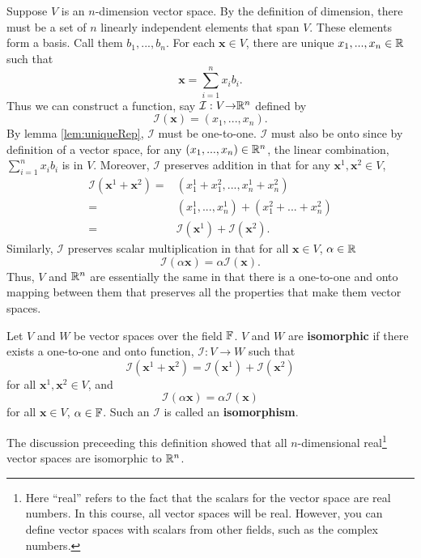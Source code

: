 Suppose $V$ is an $n$-dimension vector space. By the definition of dimension,
there must be a set of $n$ linearly independent elements that span
$V$. These elements form a basis. Call them $b_1, ..., b_n$. For each
$\mathbf{x} \in V$, there are unique $x_1, ..., x_n \in \mathbb{R}$ such that 
\[ \mathbf{x} = \sum_{i=1}^n x_i b_i. \]
Thus we can construct a function, say $\mathcal{I}: V {\rightarrow} \mathbb{R}^n$ defined by 
\[ \mathcal{I}(\mathbf{x}) = (x_1, ..., x_n). \]
By lemma \ref{lem:uniqueRep}, $\mathcal{I}$ must be one-to-one. $\mathcal{I}$ must also be
onto since by definition of a vector space, for any $(x_1, ..., x_n)
\in \mathbb{R}^n$, the linear combination, $\sum_{i=1}^n x_i b_i$ is in
$V$. Moreover, $\mathcal{I}$ preserves addition in that for
any $\mathbf{x}^1, \mathbf{x}^2 \in V$,
\begin{align*}
  \mathcal{I}(\mathbf{x}^1 + \mathbf{x}^2) = & (x_1^1 + x_1^2, ..., x_n^1 + x_n^2) \\
  = & (x_1^1, ..., x_n^1) + (x_1^2 + ... + x_n^2) \\
  = & \mathcal{I}(\mathbf{x}^1) + \mathcal{I}(\mathbf{x}^2).
\end{align*}
Similarly, $\mathcal{I}$ preserves scalar multiplication in that for all $\mathbf{x} \in
V$, $\alpha \in \mathbb{R}$
\[ \mathcal{I}(\alpha \mathbf{x}) = \alpha \mathcal{I}(\mathbf{x}). \]
Thus, $V$ and $\mathbb{R}^n$ are essentially the same in that there is a
one-to-one and onto mapping between them that preserves all the
properties that make them vector spaces. 
\begin{definition}
  Let $V$ and $W$ be vector spaces over the field $\mathbb{F}$. $V$ and $W$ are
  \textbf{isomorphic} if there exists a one-to-one and onto function,
  $\mathcal{I}:V \to W$ such that 
  \[ \mathcal{I}(\mathbf{x}^1 + \mathbf{x}^2) =
  \mathcal{I}(\mathbf{x}^1) + \mathcal{I}(\mathbf{x}^2) \] for all
  $\mathbf{x}^1, \mathbf{x}^2 \in V$, and
  \[ \mathcal{I}(\alpha \mathbf{x}) = \alpha \mathcal{I}(\mathbf{x}) \]
  for all $\mathbf{x} \in V$, $\alpha \in \mathbb{F}$.
  Such an $\mathcal{I}$ is called an \textbf{isomorphism}.
\end{definition}
The discussion preceeding this definition showed that all
$n$-dimensional real\footnote{Here ``real'' refers to the fact that
  the scalars for the vector space are real numbers. In this course,
  all vector spaces will be real. However, you can define vector
  spaces with scalars from other fields, such as the complex numbers.}
vector spaces are isomorphic to $\mathbb{R}^n$. 

